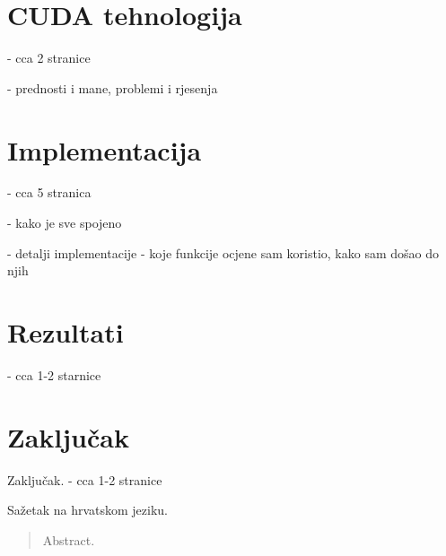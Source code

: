 \documentclass[times, utf8, zavrsni]{fer}
\begin{document}
\chapter{CUDA tehnologija}
- cca 2 stranice

- prednosti i mane, problemi i rjesenja

\chapter{Implementacija}
- cca 5 stranica

- kako je sve spojeno

- detalji implementacije - koje funkcije ocjene sam koristio, kako sam došao do njih

\chapter{Rezultati}
- cca 1-2 starnice

\chapter{Zaključak}
Zaključak.
- cca 1-2 stranice

{}


\begin{sazetak}
Sažetak na hrvatskom jeziku.

\end{sazetak}

\begin{abstract}
Abstract.

\end{abstract}
\end{document}
